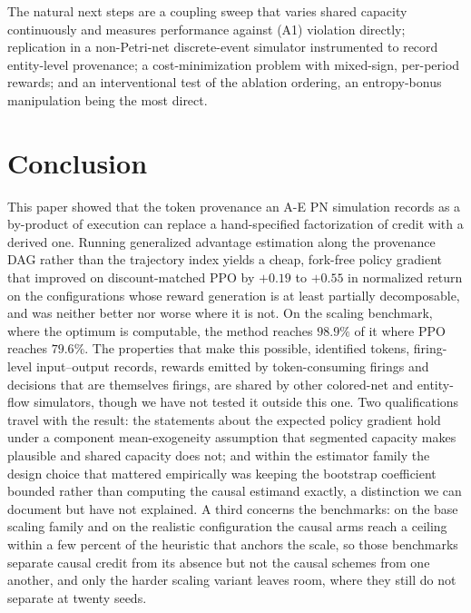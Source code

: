 \documentclass[review,authoryear,3p,times]{elsarticle}
\begin{document}
The natural next steps are a coupling sweep that varies shared capacity
continuously and measures performance against (A1) violation directly;
replication in a non-Petri-net discrete-event simulator instrumented to record
entity-level provenance; a cost-minimization problem with mixed-sign,
per-period rewards; and an interventional test of the ablation ordering, an
entropy-bonus manipulation being the most direct.

\section{Conclusion}
\label{sec:conclusion}

This paper showed that the token provenance an A-E PN simulation records as a
by-product of execution can replace a hand-specified factorization of credit
with a derived one. Running generalized advantage estimation along the
provenance DAG rather than the trajectory index yields a cheap, fork-free
policy gradient that improved on discount-matched PPO by $+0.19$ to $+0.55$ in
normalized return on the configurations whose reward generation is at least
partially decomposable, and was neither better nor worse where it is not. On
the scaling benchmark, where the optimum is computable, the method reaches
$98.9\%$ of it where PPO reaches $79.6\%$. The properties that make this
possible, identified tokens, firing-level input--output records, rewards
emitted by token-consuming firings and decisions that are themselves firings,
are shared by other colored-net and entity-flow simulators, though we have not
tested it outside this one. Two qualifications travel with the result: the
statements about the expected policy gradient hold under a component
mean-exogeneity assumption that segmented capacity makes plausible and shared
capacity does not; and within the estimator family the design choice that
mattered empirically was keeping the bootstrap coefficient bounded rather than
computing the causal estimand exactly, a distinction we can document but have
not explained. A third concerns the benchmarks: on the base scaling family and
on the realistic configuration the causal arms reach a ceiling within a few
percent of the heuristic that anchors the scale, so those benchmarks separate
causal credit from its absence but not the causal schemes from one another,
and only the harder scaling variant leaves room, where they still do not
separate at twenty seeds.
\end{document}

